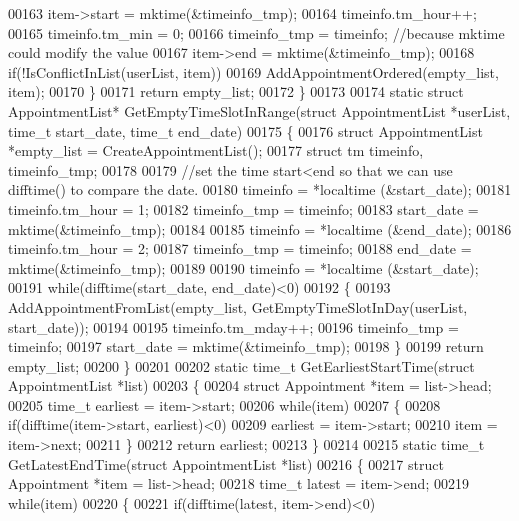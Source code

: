 \begin{DoxyCode}
00163         item->start = mktime(&timeinfo\_tmp);
00164         timeinfo.tm\_hour++;
00165         timeinfo.tm\_min = 0;
00166         timeinfo\_tmp = timeinfo;    \textcolor{comment}{//because mktime could modify the value}
00167         item->end = mktime(&timeinfo\_tmp);
00168         \textcolor{keywordflow}{if}(!IsConflictInList(userList, item))
00169             AddAppointmentOrdered(empty\_list, item);
00170     \}
00171     \textcolor{keywordflow}{return} empty\_list;
00172 \}
00173 
00174 \textcolor{keyword}{static} \textcolor{keyword}{struct }AppointmentList* GetEmptyTimeSlotInRange(\textcolor{keyword}{struct} AppointmentList *userList, time\_t start\_date,
       time\_t end\_date)
00175 \{
00176     \textcolor{keyword}{struct }AppointmentList *empty\_list = CreateAppointmentList();
00177     \textcolor{keyword}{struct }tm timeinfo, timeinfo\_tmp;
00178 
00179     \textcolor{comment}{//set the time start<end so that we can use difftime() to compare the date.}
00180     timeinfo = *localtime (&start\_date);
00181     timeinfo.tm\_hour = 1;
00182     timeinfo\_tmp = timeinfo;
00183     start\_date = mktime(&timeinfo\_tmp);
00184 
00185     timeinfo = *localtime (&end\_date);
00186     timeinfo.tm\_hour = 2;
00187     timeinfo\_tmp = timeinfo;
00188     end\_date = mktime(&timeinfo\_tmp);
00189 
00190     timeinfo = *localtime (&start\_date);
00191     \textcolor{keywordflow}{while}(difftime(start\_date, end\_date)<0)
00192     \{
00193         AddAppointmentFromList(empty\_list, GetEmptyTimeSlotInDay(userList, start\_date));
00194 
00195         timeinfo.tm\_mday++;
00196         timeinfo\_tmp = timeinfo;
00197         start\_date = mktime(&timeinfo\_tmp);
00198     \}
00199     \textcolor{keywordflow}{return} empty\_list;
00200 \}
00201 
00202 \textcolor{keyword}{static} time\_t GetEarliestStartTime(\textcolor{keyword}{struct} AppointmentList *list)
00203 \{
00204     \textcolor{keyword}{struct }Appointment *item = list->head;
00205     time\_t earliest = item->start;
00206     \textcolor{keywordflow}{while}(item)
00207     \{
00208         \textcolor{keywordflow}{if}(difftime(item->start, earliest)<0)
00209             earliest = item->start;
00210         item = item->next;
00211     \}
00212     \textcolor{keywordflow}{return} earliest;
00213 \}
00214 
00215 \textcolor{keyword}{static} time\_t GetLatestEndTime(\textcolor{keyword}{struct} AppointmentList *list)
00216 \{
00217     \textcolor{keyword}{struct }Appointment *item = list->head;
00218     time\_t latest = item->end;
00219     \textcolor{keywordflow}{while}(item)
00220     \{
00221         \textcolor{keywordflow}{if}(difftime(latest, item->end)<0)

\end{DoxyCode}
